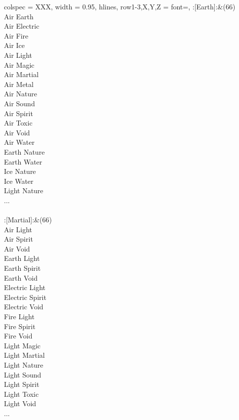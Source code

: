 \begin{longtblr}[
	caption = {1v2 Attacking Ineffective},
	label = {1v2-Attacking-Ineffective},
]{
	colspec = {XXX}, width = 0.95\linewidth,
	hlines,
	row{1-3,X,Y,Z} = {font=\bfseries},
}
	:[Earth]:&{(66)\\
	Air Earth \\
	Air Electric \\
	Air Fire \\
	Air Ice \\
	Air Light \\
	Air Magic \\
	Air Martial \\
	Air Metal \\
	Air Nature \\
	Air Sound \\
	Air Spirit \\
	Air Toxic \\
	Air Void \\
	Air Water \\
	Earth Nature \\
	Earth Water \\
	Ice Nature \\
	Ice Water \\
	Light Nature \\
	...\\
	}\\

	:[Martial]:&{(66)\\
	Air Light \\
	Air Spirit \\
	Air Void \\
	Earth Light \\
	Earth Spirit \\
	Earth Void \\
	Electric Light \\
	Electric Spirit \\
	Electric Void \\
	Fire Light \\
	Fire Spirit \\
	Fire Void \\
	Light Magic \\
	Light Martial \\
	Light Nature \\
	Light Sound \\
	Light Spirit \\
	Light Toxic \\
	Light Void \\
	...\\
	}\\


\end{longtblr}
